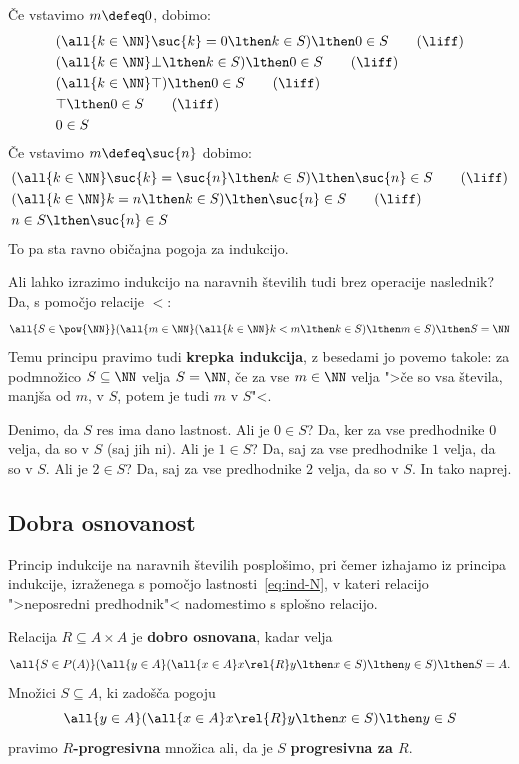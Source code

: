 %
Če vstavimo $m \defeq 0$, dobimo:
%
\begin{align}
  &(\all{k \in \NN} \suc{k} = 0 \lthen k \in S) \lthen 0 \in S \tag{$\liff$} \\
  &(\all{k \in \NN} \bot \lthen k \in S) \lthen 0 \in S \tag{$\liff$} \\
  &(\all{k \in \NN} \top) \lthen 0 \in S \tag{$\liff$} \\
  &\top \lthen 0 \in S \tag{$\liff$} \\
  &0 \in S \notag
\end{align}
%
Če vstavimo $m \defeq \suc{n}$ dobimo:
%
\begin{align}
  &(\all{k \in \NN} \suc{k} = \suc{n} \lthen k \in S) \lthen \suc{n} \in S \tag{$\liff$} \\
  &(\all{k \in \NN} k = n \lthen k \in S) \lthen \suc{n} \in S \tag{$\liff$} \\
  &n \in S \lthen \suc{n} \in S \notag
\end{align}
%
To pa sta ravno običajna pogoja za indukcijo.

Ali lahko izrazimo indukcijo na naravnih številih tudi brez operacije naslednik?
Da, s pomočjo relacije $<$:
%
\begin{equation*}
    \all{S \in \pow{\NN}} (\all{m \in \NN} (\all{k \in \NN} k < m \lthen k \in S) \lthen m \in S) \lthen S = \NN
\end{equation*}
%
Temu principu pravimo tudi \textbf{krepka indukcija}, z besedami jo povemo takole: za podmnožico $S \subseteq \NN$ velja
$S = \NN$, če za vse $m \in \NN$ velja ">če so vsa števila, manjša od $m$, v $S$, potem je tudi $m$ v $S$"<.

Denimo, da $S$ res ima dano lastnost. Ali je $0 \in S$? Da, ker za vse predhodnike $0$ velja, da
so v $S$ (saj jih ni). Ali je $1 \in S$? Da, saj za vse predhodnike $1$ velja, da so v $S$. Ali je $2 \in
S$? Da, saj za vse predhodnike $2$ velja, da so v $S$. In tako naprej.


\subsection{Dobra osnovanost}

Princip indukcije na naravnih številih posplošimo, pri čemer izhajamo iz principa indukcije, izraženega s pomočjo lastnosti~\eqref{eq:ind-N}, v kateri relacijo ">neposredni predhodnik"< nadomestimo s splošno relacijo.

\begin{definicija}
  Relacija $R \subseteq A \times A$ je \textbf{dobro osnovana}, kadar velja
  \begin{equation}
    \label{eq:ind-wf}%
    \all{S \in P(A)} (\all{y \in A} (\all{x \in A} x \rel{R} y \lthen x \in S) \lthen y \in S) \lthen S = A.
  \end{equation}
  Množici $S \subseteq A$, ki zadošča pogoju
  \begin{equation*}
  \all{y \in A} (\all{x \in A} x \rel{R} y \lthen x \in S) \lthen y \in S
  \end{equation*}
  pravimo \textbf{$R$-progresivna} množica ali, da je $S$ \textbf{progresivna za $R$}.
\end{definicija}

